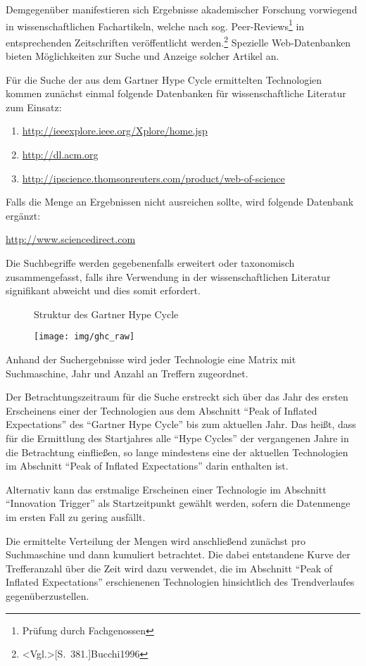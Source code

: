 Demgegenüber manifestieren sich Ergebnisse akademischer Forschung vorwiegend in wissenschaftlichen Fachartikeln, welche nach sog. \glqq Peer-Reviews\grqq \footnote{Prüfung durch Fachgenossen} in entsprechenden Zeitschriften veröffentlicht werden.\footnote{\citeNP<Vgl.>[S.~381.]{Bucchi1996}} Spezielle Web-Datenbanken bieten Möglichkeiten zur Suche und Anzeige solcher Artikel an.

Für die Suche der aus dem \glqq Gartner Hype Cycle \grqq ermittelten Technologien kommen zunächst einmal folgende Datenbanken für wissenschaftliche Literatur zum Einsatz:
\begin{enumerate}
	\item \url{http://ieeexplore.ieee.org/Xplore/home.jsp}
	\item \url{http://dl.acm.org}
	\item \url{http://ipscience.thomsonreuters.com/product/web-of-science}
\end{enumerate}

Falls die Menge an Ergebnissen nicht ausreichen sollte, wird folgende Datenbank ergänzt:

\url{http://www.sciencedirect.com}

Die Suchbegriffe werden gegebenenfalls erweitert oder taxonomisch zusammengefasst, falls ihre Verwendung in der wissenschaftlichen Literatur signifikant abweicht und dies somit erfordert.

\begin{figure}[h]
	\centering
	\caption{Struktur des \glqq Gartner Hype Cycle\grqq}
	\texttt{[image: img/ghc\_raw]}
	\caption*{\protect\fullciteNP<Quelle:>[S.~4]{Fenn2017}}
	\label{fig:ghc_raw}
\end{figure}

Anhand der Suchergebnisse wird jeder Technologie eine Matrix mit Suchmaschine, Jahr und Anzahl an Treffern zugeordnet. 

Der Betrachtungszeitraum für die Suche erstreckt sich über das Jahr des ersten Erscheinens einer der Technologien aus dem Abschnitt "`Peak of Inflated Expectations"' des "`Gartner Hype Cycle"' bis zum aktuellen Jahr. Das heißt, dass für die Ermittlung des Startjahres alle "`Hype Cycles"' der vergangenen Jahre in die Betrachtung einfließen, so lange mindestens eine der aktuellen Technologien im Abschnitt "`Peak of Inflated Expectations"' darin enthalten ist.

Alternativ kann das erstmalige Erscheinen einer Technologie im Abschnitt "`Innovation Trigger"' als Startzeitpunkt gewählt werden, sofern die Datenmenge im ersten Fall zu gering ausfällt.

Die ermittelte Verteilung der Mengen wird anschließend zunächst pro Suchmaschine und dann kumuliert betrachtet. Die dabei entstandene Kurve der Trefferanzahl über die Zeit wird dazu verwendet, die im Abschnitt "`Peak of Inflated Expectations"' erschienenen Technologien hinsichtlich des Trendverlaufes gegenüberzustellen.